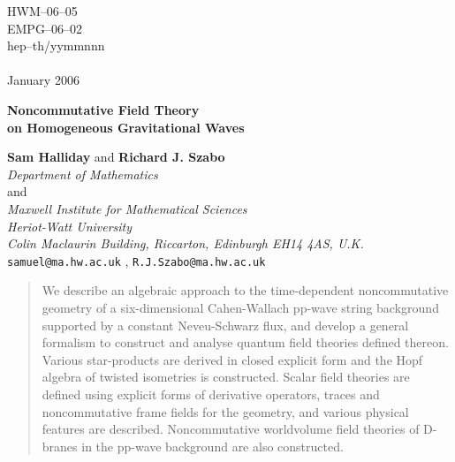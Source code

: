 \documentclass[11pt,a4paper]{article}
\newcommand{\1}{\mathbb{1}}
\begin{document}
\begin{titlepage}
\begin{flushright}

\baselineskip=12pt

HWM--06--05\\
EMPG--06--02\\
hep--th/yymmnnn\\
\hfill{ }\\
January 2006
\end{flushright}

\begin{center}

\vspace{2cm}

\baselineskip=24pt

{\Large\bf Noncommutative Field Theory \\ on Homogeneous Gravitational
  Waves}

\baselineskip=14pt

\vspace{1cm}

{\bf Sam Halliday} and {\bf Richard J. Szabo}
\\[4mm]
{\it Department of Mathematics}\\ and\\ {\it Maxwell Institute for
Mathematical Sciences\\ Heriot-Watt University\\ Colin Maclaurin Building,
  Riccarton, Edinburgh EH14 4AS, U.K.}
\\{\tt samuel@ma.hw.ac.uk} , {\tt R.J.Szabo@ma.hw.ac.uk}
\\[40mm]

\end{center}

\begin{abstract}

\baselineskip=12pt

We describe an algebraic approach to the time-dependent noncommutative
geometry of a six-dimensional Cahen-Wallach pp-wave string background
supported by a constant Neveu-Schwarz flux, and develop a general
formalism to construct and analyse quantum field theories defined
thereon. Various star-products are derived in closed explicit form and
the Hopf algebra of twisted isometries is constructed. Scalar field
theories are defined using explicit forms of derivative operators,
traces and noncommutative frame fields for the geometry, and various
physical features are described. Noncommutative worldvolume field
theories of D-branes in the pp-wave background are also constructed.

\end{abstract}

\end{titlepage}
\setcounter{page}{2}
\end{document}

